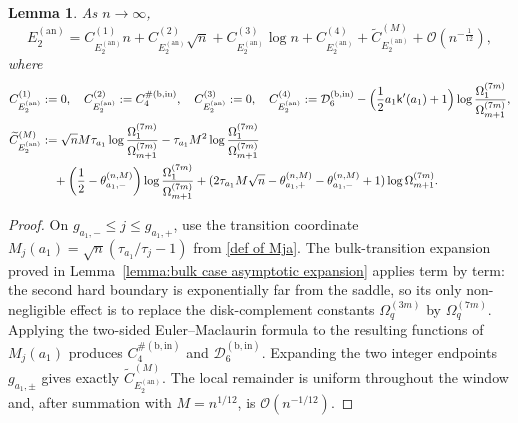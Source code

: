\documentclass[a4paper]{article}
\newtheorem{lemma}[theorem]{Lemma}
\numberwithin{equation}{section}
\begin{document}
\begin{lemma}\label{lemma:asymptotic expansion E2 annulus}
As $n\to\infty$,
\[
E_{2}^{(\mathrm{an})}
 =
 C_{E_{2}^{(\mathrm{an})}}^{(1)}n 
 + C_{E_{2}^{(\mathrm{an})}}^{(2)} \sqrt{n} 
 + C_{E_{2}^{(\mathrm{an})}}^{(3)}\log n
 + C_{E_{2}^{(\mathrm{an})}}^{(4)} 
 + \widetilde{C}_{E_{2}^{(\mathrm{an})}}^{(M)} 
 + \mathcal{O}(n^{-\frac{1}{12}}), 
\]
where   
\begin{align*}
C_{E_{2}^{(\mathrm{an})}}^{(1)}
&:=0, 
\quad
C_{E_{2}^{(\mathrm{an})}}^{(2)}
:=C_4^{\#(\mathrm{b,in})},
\quad
C_{E_{2}^{(\mathrm{an})}}^{(3)}
:=0,
\quad
C_{E_{2}^{(\mathrm{an})}}^{(4)}
:=
\mathcal{D}_6^{(\mathrm{b},\mathrm{in})}
-
\Bigl( 
\frac{1}{2}a_1\mathsf{k}'(a_1)+1
\Bigr)
\log\frac{\Omega_{1}^{(7m)}}{\Omega_{m+1}^{(7m)}}, 
\\
\widetilde{C}_{E_{2}^{(\mathrm{an})}}^{(M)} 
&:=
\sqrt{n}M\tau_{a_1}\log\frac{\Omega_{1}^{(7m)}}{\Omega_{m+1}^{(7m)}}
-
\tau_{a_1}M^2
\log\frac{\Omega_{1}^{(7m)}}{\Omega_{m+1}^{(7m)}}
\\
&\quad
+ \bigg( \frac{1}{2}-\theta_{a_1,-}^{(n,M)} \bigg)\log\frac{\Omega_{1}^{(7m)}}{\Omega_{m+1}^{(7m)}}
+
(2\tau_{a_1}M\sqrt{n}-\theta_{a_1,+}^{(n,M)}-\theta_{a_1,-}^{(n,M)}+1)\log \Omega_{m+1}^{(7m)}.
\end{align*}  

\end{lemma}


\begin{proof}
On $g_{a_1,-}\le j\le g_{a_1,+}$, use the transition coordinate
$M_j(a_1)=\sqrt n(\tau_{a_1}/\tau_j-1)$ from
\eqref{def of Mja}.  The bulk-transition expansion proved in
Lemma~\ref{lemma:bulk case asymptotic expansion} applies term by term: the
second hard boundary is exponentially far from the saddle, so its only
non-negligible effect is to replace the disk-complement constants
$\Omega_q^{(3m)}$ by $\Omega_q^{(7m)}$.  Applying the two-sided
Euler--Maclaurin formula to the resulting functions of $M_j(a_1)$ produces
$C_4^{\#(\mathrm{b,in})}$ and $\mathcal D_6^{(\mathrm{b,in})}$.
Expanding the two integer endpoints $g_{a_1,\pm}$ gives exactly
$\widetilde C_{E_2^{(\mathrm{an})}}^{(M)}$.  The local remainder is uniform
throughout the window and, after summation with $M=n^{1/12}$, is
$\mathcal O(n^{-1/12})$.
\end{proof}
\end{document}
